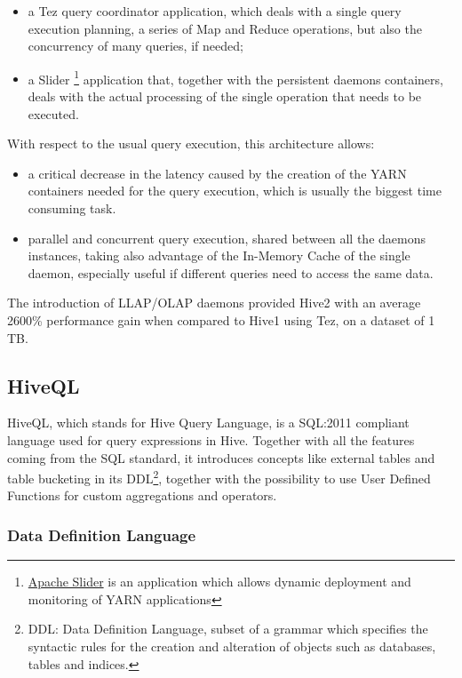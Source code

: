 \begin{itemize}
    \item a Tez query coordinator application, which deals with a single query execution planning, a series of Map and Reduce operations, but also the concurrency of many queries, if needed;
    \item a Slider \footnote{\href{https://slider.incubator.apache.org/}{Apache Slider} is an application which allows dynamic deployment and monitoring of YARN applications} application that, together with the persistent daemons containers, deals with the actual processing of the single operation that needs to be executed.
\end{itemize}

With respect to the usual query execution, this architecture allows:

\begin{itemize} 
	\item a critical decrease in the latency caused by the creation of the YARN containers needed for the query execution, which is usually the biggest time consuming task.
	\item parallel and concurrent query execution, shared between all the daemons instances, taking also advantage of the In-Memory Cache of the single daemon, especially useful if different queries need to access the same data.
\end{itemize}

The introduction of LLAP/OLAP daemons provided Hive2 with an average 2600\% performance gain when compared to Hive1 using Tez, on a dataset of 1 TB.

\subsection{HiveQL}

HiveQL, which stands for Hive Query Language, is a SQL:2011 compliant language used for query expressions in Hive. Together with all the features coming from the SQL standard, it introduces concepts like external tables and table bucketing in its DDL\footnote{DDL: Data Definition Language, subset of a grammar which specifies the syntactic rules for the creation and alteration of objects such as databases, tables and indices.}, together with the possibility to use User Defined Functions for custom aggregations and operators.

\subsubsection{Data Definition Language}

